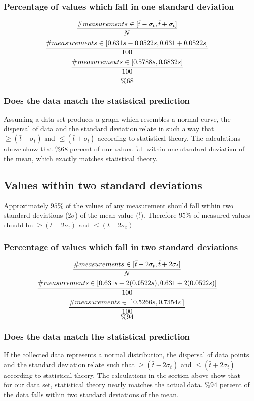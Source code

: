 \documentclass[11pt, letterpaper, includehead]{article}
\begin{document}
\subsubsection{Percentage of values which fall in one standard deviation}
$$\frac{\# measurements \in [\bar{t} - \sigma_t, \bar{t} + \sigma_t]}{N} \\$$
$$\frac{\# measurements \in [0.631s - 0.0522s, 0.631 + 0.0522s]}{100} \\$$
$$\frac{\# measurements \in [0.5788s, 0.6832s]}{100} \\$$
$$\boxed{\%68}$$

\subsubsection{Does the data match the statistical prediction}
Assuming a data set produces a graph which resembles a normal
curve, the dispersal of data and the standard deviation
relate in such a way that $\geq (\bar{t} - \sigma_t)$ and $\leq (\bar{t} + \sigma_t)$
according to statistical theory. The calculations above show that
$\%68$ percent of our values fall within one standard deviation of the mean,
which exactly matches statistical theory.

\subsection{Values within two standard deviations} %
Approximately $95\%$ of the values of any measurement should fall within two
standard deviations ($2 \sigma$) of the mean value ($\bar{t}$). Therefore $95\%$ of measured
values should be $\geq (t - 2 \sigma_t)$ and $\leq (t + 2 \sigma_t)$

\subsubsection{Percentage of values which fall in two standard deviations}
$$\frac{\# measurements \in [\bar{t} - 2\sigma_t, \bar{t} + 2\sigma_t]}{N} \\$$
$$\frac{\# measurements \in [0.631s - 2(0.0522s), 0.631 + 2(0.0522s)]}{100} \\$$
$$\frac{\# measurements \in [0.5266s, 0.7354s]}{100}$$
$$\boxed{\%94}$$

\subsubsection{Does the data match the statistical prediction}
If the collected data represents a normal distribution,
the dispersal of data points and the standard deviation relate such that
$\geq (\bar{t} - 2\sigma_t)$ and $\leq (\bar{t} + 2\sigma_t)$ according
to statistical theory. The calculations in the section above show that
for our data set, statistical theory nearly matches the actual data.
$\%94$ percent of the data falls within two standard deviations of the mean.
\end{document}
